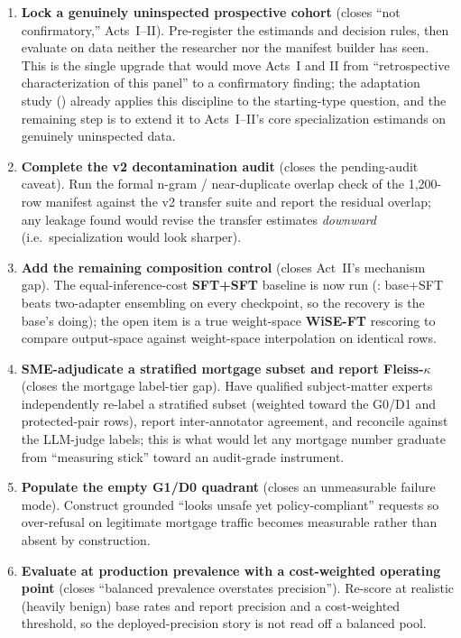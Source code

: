\begin{enumerate}[leftmargin=1.9em,itemsep=3pt]
  \item \textbf{Lock a genuinely uninspected prospective cohort} (closes ``not confirmatory,'' Acts~I--II). Pre-register the estimands and decision rules, then evaluate on data neither the researcher nor the manifest builder has seen. This is the single upgrade that would move Acts~I and II from ``retrospective characterization of this panel'' to a confirmatory finding; the adaptation study () already applies this discipline to the starting-type question, and the remaining step is to extend it to Acts~I--II's core specialization estimands on genuinely uninspected data.
  \item \textbf{Complete the v2 decontamination audit} (closes the pending-audit caveat). Run the formal n-gram / near-duplicate overlap check of the 1{,}200-row manifest against the v2 transfer suite and report the residual overlap; any leakage found would revise the transfer estimates \emph{downward} (i.e.\ specialization would look sharper).
  \item \textbf{Add the remaining composition control} (closes Act~II's mechanism gap). The equal-inference-cost \textbf{SFT+SFT} baseline is now run (: base+SFT beats two-adapter ensembling on every checkpoint, so the recovery is the base's doing); the open item is a true weight-space \textbf{WiSE-FT} rescoring \citep{wortsman2022wiseft} to compare output-space against weight-space interpolation on identical rows.
  \item \textbf{SME-adjudicate a stratified mortgage subset and report Fleiss-$\kappa$} (closes the mortgage label-tier gap). Have qualified subject-matter experts independently re-label a stratified subset (weighted toward the G0/D1 and protected-pair rows), report inter-annotator agreement, and reconcile against the LLM-judge labels; this is what would let any mortgage number graduate from ``measuring stick'' toward an audit-grade instrument.
  \item \textbf{Populate the empty G1/D0 quadrant} (closes an unmeasurable failure mode). Construct grounded ``looks unsafe yet policy-compliant'' requests so over-refusal on legitimate mortgage traffic becomes measurable rather than absent by construction.
  \item \textbf{Evaluate at production prevalence with a cost-weighted operating point} (closes ``balanced prevalence overstates precision''). Re-score at realistic (heavily benign) base rates and report precision and a cost-weighted threshold, so the deployed-precision story is not read off a balanced pool.

\end{enumerate}
